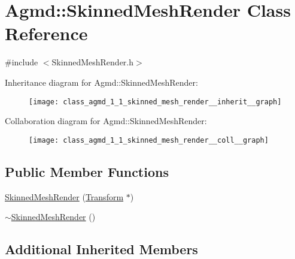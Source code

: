 \hypertarget{class_agmd_1_1_skinned_mesh_render}{\section{Agmd\+:\+:Skinned\+Mesh\+Render Class Reference}
\label{class_agmd_1_1_skinned_mesh_render}
}


{\ttfamily \#include $<$Skinned\+Mesh\+Render.\+h$>$}



Inheritance diagram for Agmd\+:\+:Skinned\+Mesh\+Render\+:\nopagebreak
\begin{figure}[H]
\begin{center}
\leavevmode
\texttt{[image: class\_agmd\_1\_1\_skinned\_mesh\_render\_\_inherit\_\_graph]}
\end{center}
\end{figure}


Collaboration diagram for Agmd\+:\+:Skinned\+Mesh\+Render\+:\nopagebreak
\begin{figure}[H]
\begin{center}
\leavevmode
\texttt{[image: class\_agmd\_1\_1\_skinned\_mesh\_render\_\_coll\_\_graph]}
\end{center}
\end{figure}
\subsection*{Public Member Functions}
\begin{DoxyCompactItemize}
\item 
\hyperlink{class_agmd_1_1_skinned_mesh_render_a523cbfe5cf779afaf0f50216854cf968}{Skinned\+Mesh\+Render} (\hyperlink{class_agmd_maths_1_1_transform}{Transform} $\ast$)
\item 
\hyperlink{class_agmd_1_1_skinned_mesh_render_a2e47d8794a8f3e5a4331e78e699ad858}{$\sim$\+Skinned\+Mesh\+Render} ()
\end{DoxyCompactItemize}
\subsection*{Additional Inherited Members}


